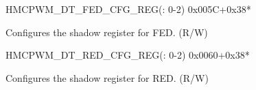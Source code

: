 \begin{register}{H}{MCPWM\_DT\_FED\_CFG\_REG(: 0-2)}
{0x005C+0x38*}\label{regdesc:MCPWMDTNFEDCFGREG}
%
%
\regnewline%
\begin{regdesc}\begin{reglist}
\label{fielddesc:MCPWMDBNFED}\item [MCPWM\_DB\regindex{n}\_FED] Configures the shadow register for FED. (R/W)
\end{reglist}\end{regdesc}
\end{register}


\begin{register}{H}{MCPWM\_DT\_RED\_CFG\_REG(: 0-2)}
{0x0060+0x38*}\label{regdesc:MCPWMDTNREDCFGREG}
%
%
\regnewline%
\begin{regdesc}\begin{reglist}
\label{fielddesc:MCPWMDBNRED}\item [MCPWM\_DB\regindex{n}\_RED] Configures the shadow register for RED. (R/W)
\end{reglist}\end{regdesc}
\end{register}



